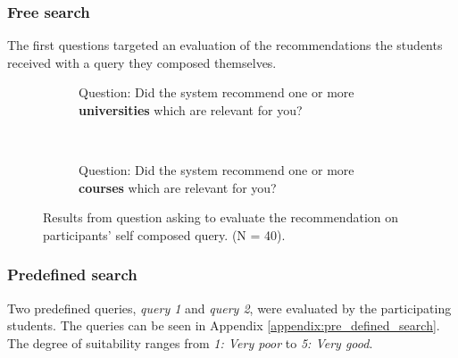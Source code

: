 \subsubsection{Free search}

The first questions targeted an evaluation of the recommendations the students received with a query they composed themselves.

\begin{figure}[H]
    \centering
    \begin{subfigure}[b]{0.4\textwidth}
        
        \caption{Question: Did the system recommend one or more \textbf{universities} which are relevant for you?}
        \label{fig:free_search_results_p1}
    \end{subfigure}
    ~ \qquad %
    \begin{subfigure}[b]{0.4\textwidth}
       
        \caption{Question: Did the system recommend one or more \textbf{courses} which are relevant for you?}
        \label{fig:free_search_results_p2}
    \end{subfigure}
    \caption[Result from evaluation of recommendation]{Results from question asking to evaluate the recommendation on participants' self composed query. (N = 40).}
    \label{fig:free_search_results}
\end{figure}

\subsubsection{Predefined search}

Two predefined queries, \textit{query 1} and \textit{query 2}, were evaluated by the participating students. The queries can be seen in Appendix \ref{appendix:pre_defined_search}. The degree of suitability ranges from \textit{1: Very poor} to \textit{5: Very good}.

